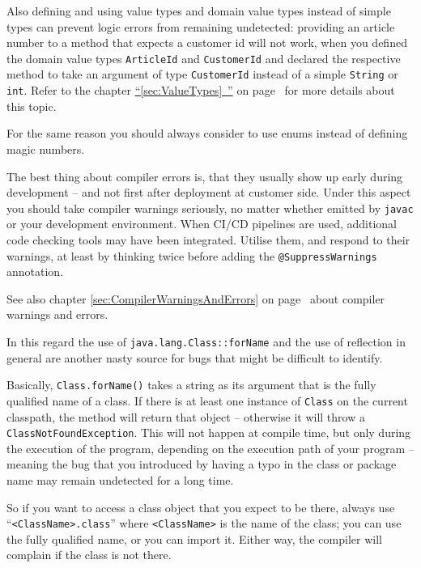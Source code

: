 \documentclass[11pt,a4paper, titlepage, parskip=half, headsepline, footsepline, cleardoublepage=current, headheight=1cm]{scrbook}
\newcommand*{\tqfullvref}[1]{\hyperref[{#1}]{“\ref*{#1}~\nameref*{#1}”} on page~\pageref{#1}}
\newcommand*{\tqvref}[1]{\hyperref[{#1}]{\ref*{#1}} on page~\pageref{#1}}
\begin{document}
Also defining and using value types and domain value types instead of simple types can prevent logic errors from remaining undetected: providing an article number to a method that expects a customer id will not work, when you defined the domain value types \lstinline|ArticleId| and \lstinline|CustomerId| and declared the respective method to take an argument of type \lstinline|CustomerId| instead of a simple \lstinline|String| or \lstinline|int|. Refer to the chapter \tqfullvref{sec:ValueTypes} for more details about this topic.

For the same reason you should always consider to use enums instead of defining magic numbers.

The best thing about compiler errors is, that they usually show up early during development – and not first after deployment at customer side. Under this aspect you should take compiler warnings seriously, no matter whether emitted by \verb#javac# or your development environment. When CI/CD pipelines are used, additional code checking tools may have been integrated. Utilise them, and respond to their warnings, at least by thinking twice before adding the \lstinline|@SuppressWarnings|\autocite{ORACLE_DOC_SUPPRESSWARNINGS_ANNOTATION} annotation.

See also chapter \tqvref{sec:CompilerWarningsAndErrors} about compiler warnings and errors.

In this regard the use of \lstinline|java.lang.Class::forName|\autocite{ORACLE_DOC_CLASS:forName} and the use of reflection in general are another nasty source for bugs that might be difficult to identify.

Basically, \lstinline|Class.forName()| takes a string as its argument that is the fully qualified name of a class. If there is at least one instance of \lstinline|Class| on the current classpath, the method will return that object – otherwise it will throw a \lstinline|ClassNotFoundException|\autocite{ORACLE_DOC_CLASSNOTFOUNDEXCEPTION_CLASS}. This will not happen at compile time, but only during the execution of the program, depending on the execution path of your program – meaning the bug that you introduced by having a typo in the class or package name may remain undetected for a long time.

So if you want to access a class object that you expect to be there, always use “\lstinline|<ClassName>.class|” where \verb#<ClassName># is the name of the class; you can use the fully qualified name, or you can import it. Either way, the compiler will complain if the class is not there.
\end{document}
